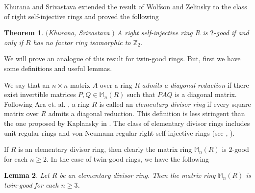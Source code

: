 \documentclass{amsart}
\newtheorem{theorem}{Theorem}
\newtheorem{lemma}[theorem]{Lemma}
\begin{document}
Khurana and Srivastava \cite{KS1} extended the result of Wolfson and Zelinsky to the class of right self-injective rings and proved the following

\begin{theorem} $($Khurana, Srivastava \cite{KS1}$)$
A right self-injective ring $R$ is $2$-good if and only if $R$ has no factor ring isomorphic to $\mathbb{Z}_{2}$. 
\end{theorem}

We will prove an analogue of this result for twin-good rings. But, first we have some definitions and useful lemmas.

We say that an $n\times n$ matrix $A$ over a ring $R$ \textit{admits a diagonal reduction} if there exist invertible matrices $P,Q\in \mathbb M_{n}(R)$ such that $PAQ $ is a diagonal matrix. Following Ara et. al. \cite{AGMP}, a ring $R$ is called an \textit{elementary divisor ring} if every square matrix over $R$ admits a diagonal reduction. This definition is less stringent than the one proposed by Kaplansky in \cite{Kap}. The class of elementary divisor rings includes unit-regular rings and von Neumann regular right self-injective rings (see \cite{AGMP}, \cite{Henriksen2}).

 If $R$ is an elementary divisor ring, then clearly the matrix ring $\mathbb M_n(R)$ is $2$-good for each $n\ge 2$. In the case of twin-good rings, we have the following  
 
\begin{lemma} \label{edr}
Let $R$ be an elementary divisor ring. Then the matrix ring $\mathbb M_n(R)$ is twin-good for each $n \ge 3$.
\end{lemma}
\end{document}
